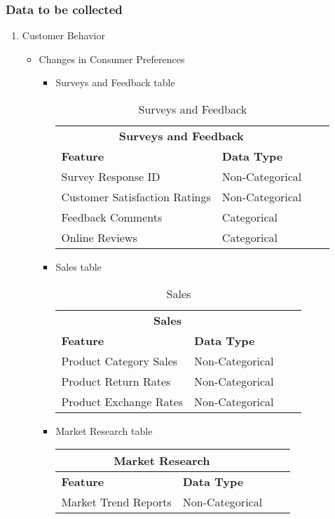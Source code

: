 \documentclass[12pt,a4Paper]{article}
\begin{document}
\subsubsection{Data to be collected}
\begin{enumerate}
\item Customer Behavior
	\begin{itemize}
	\item Changes in Consumer Preferences
		\begin{itemize}
		\item Surveys and Feedback table
		\begin{table}
		\begin{tabular}{llll}\hline
		\multicolumn{2}{c}{\textbf{Surveys and Feedback}} & &\\
		\textbf{Feature} & \textbf{Data Type}\\\hline
		Survey Response ID & Non-Categorical\\
		Customer Satisfaction Ratings & Non-Categorical\\
		Feedback Comments & Categorical\\
		Online Reviews & Categorical\\\hline
		\end{tabular}
		\centering
		\caption{Surveys and Feedback}
		\end{table}
		\item Sales table
		\begin{table}
		\begin{tabular}{llll}\hline
		\multicolumn{2}{c}{\textbf{Sales}} & &\\
		\textbf{Feature} & \textbf{Data Type}\\\hline
		Product Category Sales & Non-Categorical\\
		Product Return Rates & Non-Categorical\\
		Product Exchange Rates & Non-Categorical\\\hline
		\end{tabular}
		\centering
		\caption{Sales}
		\end{table}
		\item Market Research table
		\begin{table}
		\begin{tabular}{llll}\hline
		\multicolumn{2}{c}{\textbf{Market Research}} & &\\\hline
		\textbf{Feature} & \textbf{Data Type}\\
		Market Trend Reports & Non-Categorical\\

\end{tabular}
\end{table}
\end{itemize}
\end{itemize}
\end{enumerate}
\end{document}

